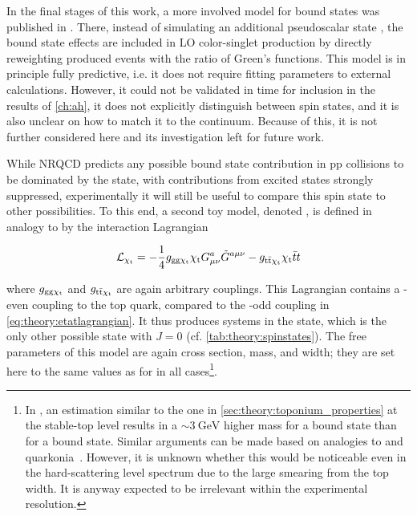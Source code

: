 In the final stages of this work, a more involved model for \ttbar bound states was published in . There, instead of simulating an additional pseudoscalar state \etat, the bound state effects are included in LO color-singlet \ttbar production by directly reweighting produced events with the ratio of Green's functions. This model is in principle fully predictive, i.e. it does not require fitting parameters to external calculations. However, it could not be validated in time for inclusion in the results of \cref{ch:ah}, it does not explicitly distinguish between \ttbar spin states, and it is also unclear on how to match it to the \ttbar continuum. Because of this, it is not further considered here and its investigation left for future work.

While NRQCD predicts any possible \ttbar bound state contribution in pp collisions to be dominated by the  state, with contributions from excited states strongly suppressed, experimentally it will still be useful to compare this spin state to other possibilities. To this end, a second toy model, denoted \chit, is defined in analogy to \etat by the interaction Lagrangian

\begin{equation}
  \mathcal{L}_{\mathrm{\chi_t}} = - \frac{1}{4} g_{\mathrm{gg} \mathrm{\chi_t}} \mathrm{\chi_t} G^{a}_{\mu \nu} \tilde{G}^{a \mu \nu} - g_{\mathrm{t \bar{t}} \mathrm{\chi_t}} \mathrm{\chi_t} \bar{t} t
\end{equation}

\noindent where $g_{\mathrm{gg} \mathrm{\chi_t}}$ and $g_{\mathrm{t \bar{t}} \mathrm{\chi_t}}$ are again arbitrary couplings. This Lagrangian contains a \CP-even coupling to the top quark, compared to the \CP-odd coupling in \cref{eq:theory:etatlagrangian}. It thus produces \ttbar systems in the  state, which is the only other possible state with $J = 0$ (cf. \cref{tab:theory:spinstates}). The free parameters of this model are again cross section, mass, and width; they are set here to the same values as for \etat in all cases\footnote{In , an estimation similar to the one in \cref{sec:theory:toponium_properties} at the stable-top level results in a $\sim\SI{3}{\GeV}$ higher mass for a  bound state than for a  bound state. Similar arguments can be made based on analogies to \ccbar and \bbbar quarkonia~\cite{Barnes:2005pb}. However, it is unknown whether this would be noticeable even in the hard-scattering level spectrum due to the large smearing from the top width. It is anyway expected to be irrelevant within the experimental resolution.}. 

